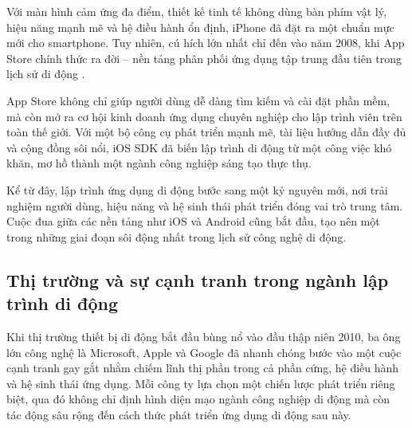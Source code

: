   \begin{flushleft}
  \hspace*{0.8cm}Với màn hình cảm ứng đa điểm, thiết kế tinh tế không dùng bàn phím vật lý, hiệu năng mạnh mẽ và hệ điều hành ổn định, iPhone đã đặt ra một chuẩn mực mới cho smartphone. Tuy nhiên, cú hích lớn nhất chỉ đến vào năm 2008, khi App Store chính thức ra đời – nền tảng phân phối ứng dụng tập trung đầu tiên trong lịch sử di động \cite{appstore-launch}.
  \end{flushleft}
  
  \begin{flushleft}
  \hspace*{0.8cm}App Store không chỉ giúp người dùng dễ dàng tìm kiếm và cài đặt phần mềm, mà còn mở ra cơ hội kinh doanh ứng dụng chuyên nghiệp cho lập trình viên trên toàn thế giới. Với một bộ công cụ phát triển mạnh mẽ, tài liệu hướng dẫn đầy đủ và cộng đồng sôi nổi, iOS SDK đã biến lập trình di động từ một công việc khó khăn, mơ hồ thành một ngành công nghiệp sáng tạo thực thụ.
  \end{flushleft}
  
  \begin{flushleft}
  \hspace*{0.8cm}Kể từ đây, lập trình ứng dụng di động bước sang một kỷ nguyên mới, nơi trải nghiệm người dùng, hiệu năng và hệ sinh thái phát triển đóng vai trò trung tâm. Cuộc đua giữa các nền tảng như iOS và Android cũng bắt đầu, tạo nên một trong những giai đoạn sôi động nhất trong lịch sử công nghệ di động.
  \end{flushleft}

\subsection{Thị trường và sự cạnh tranh trong ngành lập trình di động}
\renewcommand{\labelitemi}{--}    
    \begin{flushleft}
        \hspace*{0.8cm}Khi thị trường thiết bị di động bắt đầu bùng nổ vào đầu thập niên 2010, ba ông lớn công nghệ là Microsoft, Apple và Google đã nhanh chóng bước vào một cuộc cạnh tranh gay gắt nhằm chiếm lĩnh thị phần trong cả phần cứng, hệ điều hành và hệ sinh thái ứng dụng. Mỗi công ty lựa chọn một chiến lược phát triển riêng biệt, qua đó không chỉ định hình diện mạo ngành công nghiệp di động mà còn tác động sâu rộng đến cách thức phát triển ứng dụng di động sau này.
    \end{flushleft}


